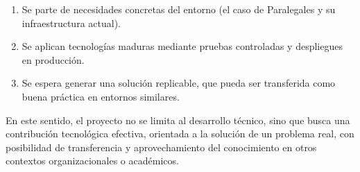 \begin{enumerate}
  \item Se parte de necesidades concretas del entorno (el caso de Paralegales y su infraestructura actual).
  \item Se aplican tecnologías maduras mediante pruebas controladas y despliegues en producción.
  \item Se espera generar una solución replicable, que pueda ser transferida como buena práctica en entornos similares.
\end{enumerate}

En este sentido, el proyecto no se limita al desarrollo técnico, sino que busca una contribución tecnológica efectiva, orientada a la solución de un problema real, con posibilidad de transferencia y aprovechamiento del conocimiento en otros contextos organizacionales o académicos.
